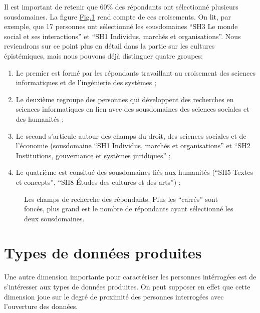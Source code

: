 \documentclass[letterpaper,10pt,english]{jupyterBook}
\begin{document}
\sphinxAtStartPar
Il est important de retenir que 60\% des répondants ont sélectionné plusieurs sous\sphinxhyphen{}domaines. La figure \hyperref[\detokenize{script_analyse/synthese/main_results:research-fields-fig}]{Fig.\@ \ref{\detokenize{script_analyse/synthese/main_results:research-fields-fig}}} rend compte de ces croisements. On lit, par exemple, que 17 personnes ont sélectionné les sous\sphinxhyphen{}domaines “SH3 Le monde social et ses interactions” et “SH1 Individus, marchés et organisations”. Nous reviendrons sur ce point plus en détail dans la partie sur les cultures épistémiques, mais nous pouvons déjà distinguer quatre groupes:
\begin{enumerate}
%
\item {} 
\sphinxAtStartPar
Le premier est formé par les répondants travaillant au croisement des sciences informatiques et de l’ingénierie des systèmes ;

\item {} 
\sphinxAtStartPar
Le deuxième regroupe des personnes qui développent des recherches en sciences informatiques en lien avec des sous\sphinxhyphen{}domaines des sciences sociales et des humanités ;

\item {} 
\sphinxAtStartPar
Le second s’articule autour des champs du droit, des sciences sociales et de l’économie (sous\sphinxhyphen{}domaine “SH1 Individus, marchés et organisations” et “SH2 Institutions, gouvernance et systèmes juridiques” ;

\item {} 
\sphinxAtStartPar
Le quatrième est consitué des sous\sphinxhyphen{}domaines liés aux humanités (“SH5 Textes et concepts”, “SH8 Études des cultures et des arts”) ;

\end{enumerate}

\begin{figure}[htbp]
\centering
\capstart

\noindent{}
\caption{Les champs de recherche des répondants. Plus les “carrés” sont foncés, plus grand est le nombre de répondants ayant sélectionné les deux sous\sphinxhyphen{}domaines.}\label{\detokenize{script_analyse/synthese/main_results:research-fields-fig}}\end{figure}


\section{Types de données produites}
\label{\detokenize{script_analyse/synthese/main_results:types-de-donnees-produites}}
\sphinxAtStartPar
Une autre dimension importante pour caractériser les personnes intérrogées est de s’intéresser aux types de données produites. On peut supposer en effet que cette dimension joue sur le degré de proximité des personnes interrogées avec l’ouverture des données.
\end{document}
